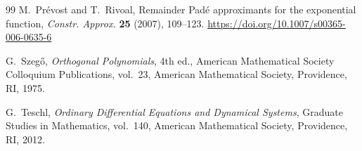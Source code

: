 \documentclass[11pt]{article}
\numberwithin{equation}{section}
\theoremstyle{definition}
\theoremstyle{remark}
\begin{document}
\begin{thebibliography}{99}
M.~Pr\'evost and T.~Rivoal,
Remainder Pad\'e approximants for the exponential function,
\emph{Constr. Approx.} \textbf{25} (2007), 109--123.
\url{https://doi.org/10.1007/s00365-006-0635-6}

G.~Szeg\H{o},
\emph{Orthogonal Polynomials}, 4th ed.,
American Mathematical Society Colloquium Publications, vol.~23,
American Mathematical Society, Providence, RI, 1975.

G.~Teschl,
\emph{Ordinary Differential Equations and Dynamical Systems},
Graduate Studies in Mathematics, vol.~140,
American Mathematical Society, Providence, RI, 2012.

\end{thebibliography}
\end{document}
